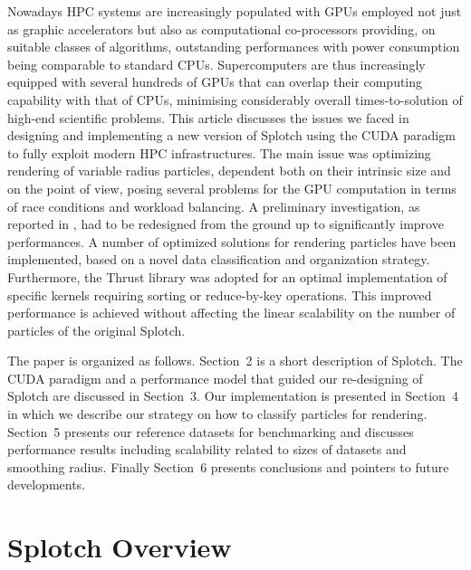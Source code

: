 \documentclass[1p]{elsarticle}
\begin{document}
Nowadays HPC systems are increasingly populated with GPUs employed not just as graphic accelerators but also as computational co-processors providing, on suitable classes of algorithms, outstanding performances with power consumption being comparable to standard CPUs. Supercomputers are thus increasingly equipped with several hundreds of GPUs that can overlap their computing capability with that of CPUs, minimising considerably overall times-to-solution of high-end scientific problems. This article discusses the issues we faced in designing and implementing a new version of Splotch using the CUDA paradigm \cite{cudaurl} to fully exploit modern HPC infrastructures. The main issue was optimizing rendering of variable radius particles, dependent both on their intrinsic size and on the point of view, posing several problems for the GPU computation in terms of race conditions and workload balancing. A preliminary investigation, as reported in \cite{jin:high-performance}, had to be redesigned from the ground up to significantly improve performances. A number of optimized solutions for rendering particles have been implemented, based on a novel data classification and organization strategy. Furthermore, the Thrust library \cite{thrusturl} was adopted for an optimal implementation of specific kernels requiring sorting or reduce-by-key operations.
This improved performance is achieved without affecting the linear scalability on the number of particles of the original Splotch. 

The paper is organized as follows. 
Section~2 is a short description of Splotch. The CUDA paradigm and a performance model that guided our re-designing of Splotch are discussed in Section~3. Our implementation is presented in Section~4 in which we describe our strategy on how to classify particles for rendering. Section~5 presents our reference datasets for benchmarking and discusses performance results including scalability related to sizes of datasets and smoothing radius. Finally Section~6 presents conclusions and pointers to future developments.

\section{Splotch Overview}
\label{sec:overview}
\end{document}
